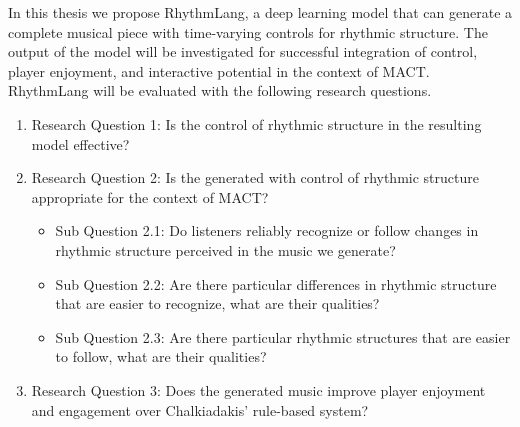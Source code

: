 In this thesis we propose RhythmLang, a deep learning model that can generate a complete musical piece with time-varying controls for rhythmic structure. The output of the model will be investigated for successful integration of control, player enjoyment, and interactive potential in the context of MACT. RhythmLang will be evaluated with the following research questions.
\begin{enumerate}
\item{Research Question 1}: Is the control of rhythmic structure in the resulting model effective?
\item{Research Question 2}: Is the generated with control of rhythmic structure appropriate for the context of MACT?
\begin{itemize}
\item{Sub Question 2.1}: Do listeners reliably recognize or follow changes in rhythmic structure perceived in the music we generate?
\item{Sub Question 2.2}: Are there particular differences in rhythmic structure that are easier to recognize, what are their qualities?
\item{Sub Question 2.3}: Are there particular rhythmic structures that are easier to follow, what are their qualities? 
\end{itemize}
\item {Research Question 3}: Does the generated music improve player enjoyment and engagement over Chalkiadakis' \cite{Chalkiadakis_2022} rule-based system? 
\end{enumerate}
